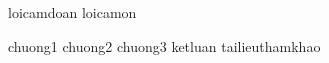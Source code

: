 \documentclass[14pt, a4paper, reqno, oneside]{book}
\theoremstyle {definition}
\numberwithin{equation}{section}
\begin{document}
\large
\newpage
\pagestyle{danh_trang_tren_header}
\fontsize{14pt}{25pt}\selectfont
{}
{
 {loicamdoan}
 {loicamon}
\listoffigures
\tableofcontents
\newpage
}

 {chuong1}
 {chuong2}
 {chuong3}
 {ketluan}
 {tailieuthamkhao}
\end{document}
